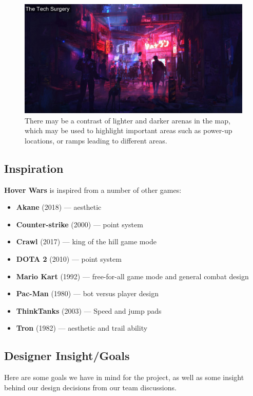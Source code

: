 \documentclass{article}
\newcommand{\namenobold}{Hover Wars}
\newcommand{\name}{\textbf{\namenobold}}
\theoremstyle{definition}
\begin{document}
\begin{figure}[htpb]
  \centering
  \includegraphics[width=0.8\linewidth]{theme03.jpg}
  \caption{There may be a contrast of lighter and darker arenas in the map,
  which may be used to highlight important areas such as power-up locations, or
ramps leading to different areas.}
\label{fig:theme03}
\end{figure}

\subsection{Inspiration}

\name{} is inspired from a number of other games:
\begin{itemize}
  \item \textbf{Akane} (2018) --- aesthetic
  \item \textbf{Counter-strike} (2000) --- point system
  \item \textbf{Crawl} (2017) --- king of the hill game mode
  \item \textbf{DOTA 2} (2010) --- point system
  \item \textbf{Mario Kart} (1992) --- free-for-all game mode and general combat design
  \item \textbf{Pac-Man} (1980) --- bot versus player design
  \item \textbf{ThinkTanks} (2003) --- Speed and jump pads
  \item \textbf{Tron} (1982) --- aesthetic and trail ability
\end{itemize}

\subsection{Designer Insight/Goals}

Here are some goals we have in mind for the project, as well as some insight
behind our design decisions from our team discussions.
\end{document}

